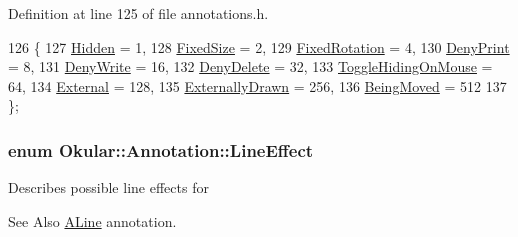 Definition at line 125 of file annotations.\+h.


\begin{DoxyCode}
126         \{
127             \hyperlink{classOkular_1_1Annotation_a8a214541446745761efeda70b3a4302ea053e3857f5c7f494a996e649e5e97244}{Hidden} = 1,               
128             \hyperlink{classOkular_1_1Annotation_a8a214541446745761efeda70b3a4302eaa392139d58e61edfc34c3574d835448f}{FixedSize} = 2,            
129             \hyperlink{classOkular_1_1Annotation_a8a214541446745761efeda70b3a4302ea31a80c8e10831d2dccdf80cadb74fb3c}{FixedRotation} = 4,        
130             \hyperlink{classOkular_1_1Annotation_a8a214541446745761efeda70b3a4302ea06c4d960d7e0537c702c5b21a445001e}{DenyPrint} = 8,            
131             \hyperlink{classOkular_1_1Annotation_a8a214541446745761efeda70b3a4302ead5a9f7601c7a91f887f03bf90a933740}{DenyWrite} = 16,           
132             \hyperlink{classOkular_1_1Annotation_a8a214541446745761efeda70b3a4302ea1ac69f31d992e95ae3c11420875c6293}{DenyDelete} = 32,          
133             \hyperlink{classOkular_1_1Annotation_a8a214541446745761efeda70b3a4302ea6709674abe1d70451bf9f70252d46a35}{ToggleHidingOnMouse} = 64, 
134             \hyperlink{classOkular_1_1Annotation_a8a214541446745761efeda70b3a4302eabe908102c97a725aa1928602f17833c0}{External} = 128,           
135             \hyperlink{classOkular_1_1Annotation_a8a214541446745761efeda70b3a4302ea75f088f5533ace9d9d47a506b707f5a1}{ExternallyDrawn} = 256,    
136             \hyperlink{classOkular_1_1Annotation_a8a214541446745761efeda70b3a4302ea9cd51e0fe53aac93798a205e7fb5c04a}{BeingMoved} = 512          
137         \};
\end{DoxyCode}
\hypertarget{classOkular_1_1Annotation_a9083f89e7bb24e972852685dd2c6176e}{
\subsubsection[{Line\+Effect}]{\setlength{\rightskip}{0pt plus 5cm}enum {\bf Okular\+::\+Annotation\+::\+Line\+Effect}}}\label{classOkular_1_1Annotation_a9083f89e7bb24e972852685dd2c6176e}
Describes possible line effects for \begin{DoxySeeAlso}{See Also}
\hyperlink{classOkular_1_1Annotation_af71b46e37d5f850b97d5c4de3be9aac0a7035dc978d8b79958f34e3d164838726}{A\+Line} annotation. 
\end{DoxySeeAlso}
